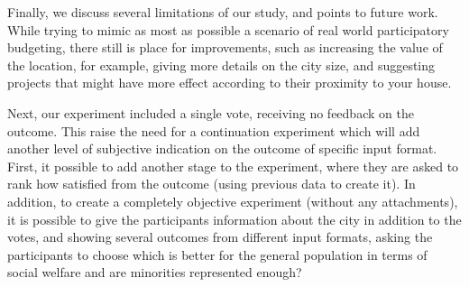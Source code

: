 \documentclass[10pt]{article}
\begin{document}

Finally, we discuss several limitations of our study, and points to future work. While trying to mimic as most as possible a scenario of real world participatory budgeting, there still is place for improvements, such as increasing the value of the location, for example, giving more details on the city size, and suggesting projects that might have more effect according to their proximity to your house.

Next, our experiment included a single vote, receiving no feedback on the outcome. This raise the need for a continuation experiment which will add another level of subjective indication on the outcome of specific input format. First, it possible to add another stage to the experiment, where they are asked to rank how satisfied from the outcome (using previous data to create it). In addition, to create a completely objective experiment (without any attachments), it is possible to give the participants information about the city in addition to the votes, and showing several outcomes from different input formats, asking the participants to choose which is better for the general population in terms of social welfare and are minorities represented enough?





\end{document}
